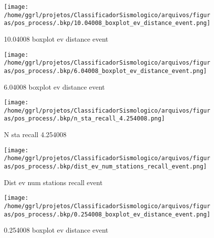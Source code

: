                     \begin{figure}[H]
                        \centering
                        \texttt{[image: /home/ggrl/projetos/ClassificadorSismologico/arquivos/figuras/pos\_process/.bkp/10.04008\_boxplot\_ev\_distance\_event.png]}
                        \caption{10.04008 boxplot ev distance event}
                        \label{fig:10.04008_boxplot_ev_distance_event}
                    \end{figure}
                

                    \begin{figure}[H]
                        \centering
                        \texttt{[image: /home/ggrl/projetos/ClassificadorSismologico/arquivos/figuras/pos\_process/.bkp/6.04008\_boxplot\_ev\_distance\_event.png]}
                        \caption{6.04008 boxplot ev distance event}
                        \label{fig:6.04008_boxplot_ev_distance_event}
                    \end{figure}
                

                    \begin{figure}[H]
                        \centering
                        \texttt{[image: /home/ggrl/projetos/ClassificadorSismologico/arquivos/figuras/pos\_process/.bkp/n\_sta\_recall\_4.254008.png]}
                        \caption{N sta recall 4.254008}
                        \label{fig:n_sta_recall_4.254008}
                    \end{figure}
                

                    \begin{figure}[H]
                        \centering
                        \texttt{[image: /home/ggrl/projetos/ClassificadorSismologico/arquivos/figuras/pos\_process/.bkp/dist\_ev\_num\_stations\_recall\_event.png]}
                        \caption{Dist ev num stations recall event}
                        \label{fig:dist_ev_num_stations_recall_event}
                    \end{figure}
                

                    \begin{figure}[H]
                        \centering
                        \texttt{[image: /home/ggrl/projetos/ClassificadorSismologico/arquivos/figuras/pos\_process/.bkp/0.254008\_boxplot\_ev\_distance\_event.png]}
                        \caption{0.254008 boxplot ev distance event}
                        \label{fig:0.254008_boxplot_ev_distance_event}
                    \end{figure}
                

